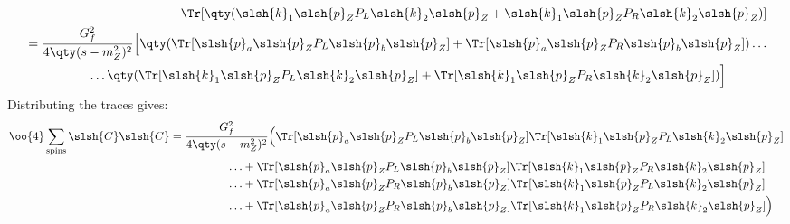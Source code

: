 \begin{align}
\begin{split}
			\Tr[
				\qty(\slsh{k}_1\slsh{p}_ZP_L\slsh{k}_2\slsh{p}_Z
				+\slsh{k}_1\slsh{p}_ZP_R\slsh{k}_2\slsh{p}_Z)
				]
		\end{split}
		\\
		\begin{split}
			&=
			\frac{G_f^2}{4\qty(s-m_Z^2)^2}
			\Big[\qty(
			\Tr[
				\slsh{p}_a\slsh{p}_ZP_L\slsh{p}_b\slsh{p}_Z
			]
				+
			\Tr[
				\slsh{p}_a\slsh{p}_ZP_R\slsh{p}_b\slsh{p}_Z
			])
			\ldots\\&\qquad\qquad\quad\ldots
			\qty(\Tr[
				\slsh{k}_1\slsh{p}_ZP_L\slsh{k}_2\slsh{p}_Z
				]
				+
			\Tr[
				\slsh{k}_1\slsh{p}_ZP_R\slsh{k}_2\slsh{p}_Z
				])
			\Big]
		\end{split}
	\end{align}
	Distributing the traces gives:
	\begin{align}
		\label{eqn:CC_result}
		\begin{split}
			\oo{4}\sum_\text{spins}\slsh{C}\slsh{C}&=
			\frac{G_f^2}{4\qty(s-m_Z^2)^2}
			\Big(
			\Tr[\slsh{p}_a\slsh{p}_ZP_L\slsh{p}_b\slsh{p}_Z]
			\Tr[\slsh{k}_1\slsh{p}_ZP_L\slsh{k}_2\slsh{p}_Z]
			\\&\qquad\qquad\quad\ldots+
			\Tr[\slsh{p}_a\slsh{p}_ZP_L\slsh{p}_b\slsh{p}_Z]
			\Tr[\slsh{k}_1\slsh{p}_ZP_R\slsh{k}_2\slsh{p}_Z]
			\\&\qquad\qquad\quad\ldots+
			\Tr[\slsh{p}_a\slsh{p}_ZP_R\slsh{p}_b\slsh{p}_Z]
			\Tr[\slsh{k}_1\slsh{p}_ZP_L\slsh{k}_2\slsh{p}_Z]
			\\&\qquad\qquad\quad\ldots+
			\Tr[\slsh{p}_a\slsh{p}_ZP_R\slsh{p}_b\slsh{p}_Z]
			\Tr[\slsh{k}_1\slsh{p}_ZP_R\slsh{k}_2\slsh{p}_Z]
			\Big)
		\end{split}
	\end{align}

